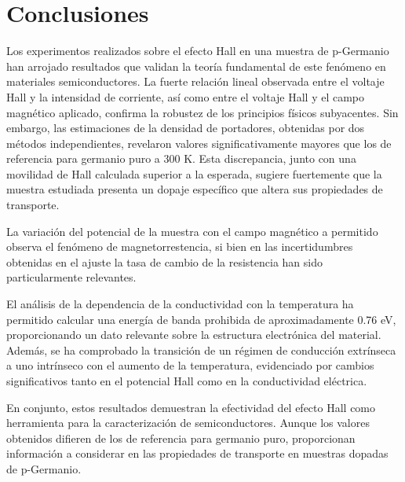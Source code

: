 	\section{Conclusiones}
	
	Los experimentos realizados sobre el efecto Hall en una muestra de p-Germanio han arrojado resultados que validan la teoría fundamental de este fenómeno en materiales semiconductores. La fuerte relación lineal observada entre el voltaje Hall y la intensidad de corriente, así como entre el voltaje Hall y el campo magnético aplicado, confirma la robustez de los principios físicos subyacentes. Sin embargo, las estimaciones de la densidad de portadores, obtenidas por dos métodos independientes, revelaron valores significativamente mayores que los de referencia para germanio puro a 300 K. Esta discrepancia, junto con una movilidad de Hall calculada superior a la esperada, sugiere fuertemente que la muestra estudiada presenta un dopaje específico que altera sus propiedades de transporte.
	
	\vspace{\baselineskip}
	
	La variación del potencial de la muestra con el campo magnético a permitido observa el fenómeno de magnetorrestencia, si bien en las incertidumbres obtenidas en el ajuste la tasa de cambio de la resistencia han sido particularmente relevantes. 
	
	\vspace{\baselineskip}
	
	El análisis de la dependencia de la conductividad con la temperatura ha permitido calcular una energía de banda prohibida de aproximadamente 0.76 eV, proporcionando un dato relevante sobre la estructura electrónica del material. Además, se ha comprobado la transición de un régimen de conducción extrínseca a uno intrínseco con el aumento de la temperatura, evidenciado por cambios significativos tanto en el potencial Hall como en la conductividad eléctrica.
	
	\vspace{\baselineskip}

	En conjunto, estos resultados demuestran la efectividad del efecto Hall como herramienta para la caracterización de semiconductores. Aunque los valores obtenidos difieren de los de referencia para germanio puro, proporcionan información a considerar en las propiedades de transporte en muestras dopadas de p-Germanio.
	
	\vspace{\baselineskip}
	
